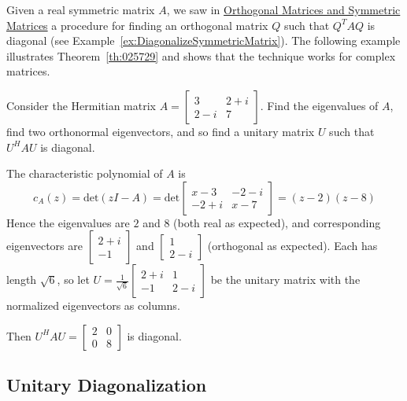 \documentclass{ximera}
\begin{document}
Given a real symmetric matrix $A$, we saw in \href{https://ximera.osu.edu/oerlinalg/LinearAlgebra/RTH-0035/main}{Orthogonal Matrices and Symmetric Matrices} a procedure for finding an orthogonal matrix $Q$ such that $Q^{T}AQ$ is diagonal (see Example~\ref{ex:DiagonalizeSymmetricMatrix}). The following example illustrates Theorem~\ref{th:025729} and shows that the technique works for complex matrices.

\begin{example}\label{ex:025794}
Consider the Hermitian matrix $A = \left[ \begin{array}{cc}
3 & 2 + i \\
2 - i & 7
\end{array}\right]$. Find the eigenvalues of $A$, find two orthonormal eigenvectors, and so find a unitary matrix $U$ such that $U^{H}AU$ is diagonal.


\begin{explanation}
  The characteristic polynomial of $A$ is
\begin{equation*}
c_{A}(z) = \mbox{det}(zI - A) = \mbox{det}\left[ \begin{array}{rr}
x - 3 & -2 - i \\
-2 + i & x - 7
\end{array}\right] = (z-2)(z-8)
\end{equation*}
Hence the eigenvalues are $2$ and $8$ (both real as expected), and corresponding eigenvectors are $\left[ \begin{array}{cc}
2 + i \\
-1
\end{array}\right]$ and $\left[ \begin{array}{cc}
1 \\
2 - i
\end{array}\right]$ (orthogonal as expected). Each has length $\sqrt{6}$,
 so let $U = \frac{1}{\sqrt{6}}\left[ \begin{array}{cc}
 2 + i & 1 \\
 -1 & 2 - i
 \end{array}\right]$ be the unitary matrix with the normalized eigenvectors as columns.

Then $U^HAU = \left[ \begin{array}{rr}
2 & 0 \\
0 & 8
\end{array}\right]$ is diagonal.
\end{explanation}
\end{example}

\subsection*{Unitary Diagonalization}
\end{document}
